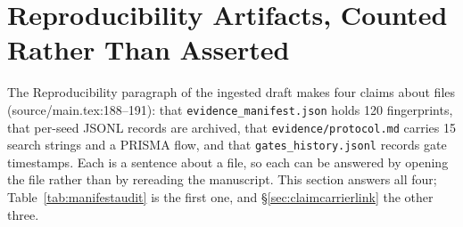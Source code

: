 \section{Reproducibility Artifacts, Counted Rather Than Asserted}\label{sec:reprocounted}
The Reproducibility paragraph of the ingested draft makes four claims about files (source/main.tex:188--191): that \texttt{evidence\_manifest.json} holds 120 fingerprints, that per-seed JSONL records are archived, that \texttt{evidence/protocol.md} carries 15 search strings and a PRISMA flow, and that \texttt{gates\_history.jsonl} records gate timestamps. Each is a sentence about a file, so each can be answered by opening the file rather than by rereading the manuscript. This section answers all four; Table~\ref{tab:manifestaudit} is the first one, and \S\ref{sec:claimcarrierlink} the other three.


